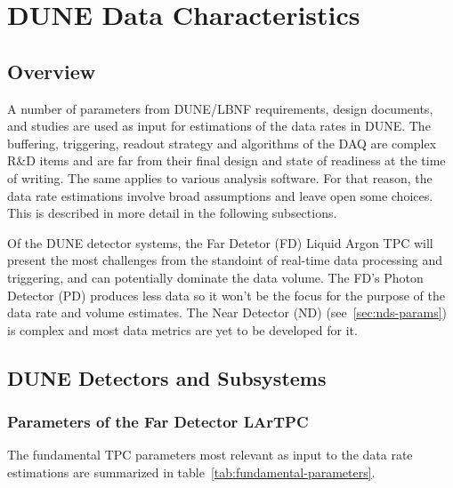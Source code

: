 \section{DUNE Data Characteristics}
\label{sec:data-characteristics}
\subsection{Overview}

A number of parameters from DUNE/LBNF requirements, design documents,  and studies are used  as input
for estimations of the data rates in DUNE.
The buffering, triggering, readout strategy and algorithms of the DAQ
are complex R\&D items and are far from their final design and state of
readiness at the time of writing.  The same applies to various analysis software.
For that reason, the data rate estimations involve broad assumptions
and leave open some choices. This is described in more detail in the following subsections.

Of the DUNE detector systems, the Far Detetor (FD) Liquid Argon TPC will present the most
challenges from the standoint of real-time data processing and triggering, and can potentially dominate the data volume.
The FD's Photon Detector (PD) produces less data so it won't be the focus
for the purpose of the data rate and volume estimates.  The Near
Detector (ND) (see~\ref{sec:nds-params}) is complex and most data metrics are yet to be developed for it.

\subsection{DUNE Detectors and Subsystems}

\subsubsection{Parameters of the Far Detector LArTPC}
\label{sec:fundamental-parameters}

The fundamental TPC parameters most relevant as input to the data rate estimations are summarized in
table~\ref{tab:fundamental-parameters}.

